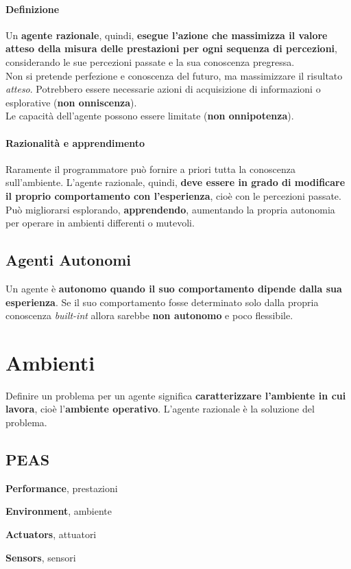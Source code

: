\documentclass[10pt]{book}
\begin{document}
\paragraph{Definizione} Un \textbf{agente razionale}, quindi, \textbf{esegue l'azione che massimizza il valore atteso della misura delle prestazioni per ogni sequenza di percezioni}, considerando le sue percezioni passate e la sua conoscenza pregressa.\\
Non si pretende perfezione e conoscenza del futuro, ma massimizzare il risultato \textit{atteso}. Potrebbero essere necessarie azioni di acquisizione di informazioni o esplorative (\textbf{non onniscenza}).\\
Le capacità dell'agente possono essere limitate (\textbf{non onnipotenza}).
\paragraph{Razionalità e apprendimento} Raramente il programmatore può fornire a priori tutta la conoscenza sull'ambiente. L'agente razionale, quindi, \textbf{deve essere in grado di modificare il proprio comportamento con l'esperienza}, cioè con le percezioni passate.\\
Può migliorarsi esplorando, \textbf{apprendendo}, aumentando la propria autonomia per operare in ambienti differenti o mutevoli.
\subsection{Agenti Autonomi} Un agente è \textbf{autonomo quando il suo comportamento dipende dalla sua esperienza}. Se il suo comportamento fosse determinato solo dalla propria conoscenza \textit{built-int} allora sarebbe \textbf{non autonomo} e poco flessibile.
\pagebreak
\section{Ambienti}
Definire un problema per un agente significa \textbf{caratterizzare l'ambiente in cui lavora}, cioè l'\textbf{ambiente operativo}. L'agente razionale è la soluzione del problema.
\subsection{PEAS}
\begin{list}{}{}
	\item \textbf{Performance}, prestazioni
	\item \textbf{Environment}, ambiente
	\item \textbf{Actuators}, attuatori
	\item \textbf{Sensors}, sensori
\end{list}
\end{document}
